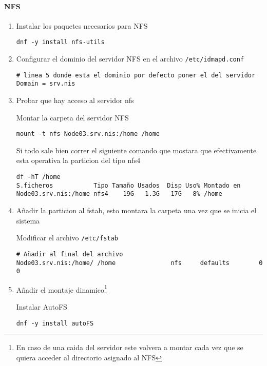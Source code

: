 \documentclass[../main.tex]{subfiles}
\begin{document}
\paragraph{NFS}
\begin{enumerate}
\item Instalar los paquetes necesarios para NFS

  \begin{lstlisting}
dnf -y install nfs-utils
\end{lstlisting}
\item Configurar el dominio del servidor NFS en el
  archivo \lstinline|/etc/idmapd.conf|
  \begin{lstlisting}
# linea 5 donde esta el dominio por defecto poner el del servidor
Domain = srv.nis
\end{lstlisting}

\item Probar que hay acceso al servidor nfs

  Montar la carpeta del servidor NFS

  \begin{lstlisting}
mount -t nfs Node03.srv.nis:/home /home
\end{lstlisting}

Si todo sale bien correr el siguiente comando que mostara que
efectivamente esta operativa la particion del tipo nfs4

\begin{lstlisting}
df -hT /home
S.ficheros           Tipo Tamaño Usados  Disp Uso% Montado en
Node03.srv.nis:/home nfs4    19G   1.3G   17G   8% /home
\end{lstlisting}

\item Añadir la particion al fstab, esto montara la carpeta una vez
  que se inicia el sistema

  Modificar el archivo \lstinline|/etc/fstab|

  \begin{lstlisting}
# Añadir al final del archivo
Node03.srv.nis:/home/ /home               nfs     defaults        0 0
\end{lstlisting}

\item Añadir el montaje dinamico\footnote{En caso de una caida
    del servidor este volvera a montar cada vez que se
    quiera acceder al directorio asignado al NFS}

  Instalar AutoFS

  \begin{lstlisting}
dnf -y install autoFS
\end{lstlisting}


\end{enumerate}
\end{document}
